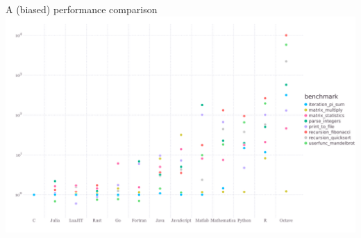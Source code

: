 \documentclass{beamer}
\begin{document}
\begin{frame}{A (biased) performance comparison}
  \center
  \includegraphics[width=\linewidth]{benchmarks}
\end{frame}
\end{document}
